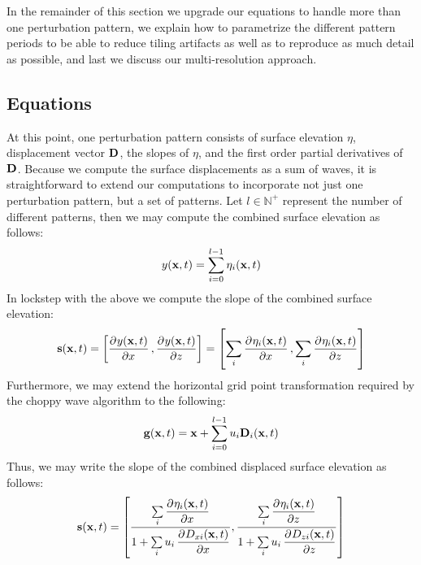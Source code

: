 
In the remainder of this section we upgrade our equations to handle more than
one perturbation pattern, we explain how to parametrize the different pattern
periods to be able to reduce tiling artifacts as well as to reproduce as much
detail as possible, and last we discuss our multi-resolution approach.
%
\subsection{Equations}
At this point, one perturbation pattern consists of surface
elevation $\eta$, displacement vector $\mathbf{D}$, the slopes of $\eta$,
and the first order partial derivatives of $\mathbf{D}$.
Because we compute the surface
displacements as a sum of waves, it is straightforward to extend our
computations to incorporate not just one perturbation pattern, but a set of
patterns. Let $l \in \mathbb{N}^+$ represent the number of different patterns,
then we may compute the combined surface elevation as follows:
\begin{equation}
 y(\mathbf{x},t) = \sum\limits_{i=0}^{l-1}\eta_i(\mathbf{x},t)
\end{equation}
In lockstep with the above we compute the slope of the combined surface elevation:
\begin{equation}
 \mvec{s}(\mvec{x},t) = \left[\dpd{y(\mvec{x},t)}{x},\dpd{y(\mvec{x},t)}{z}\right]
 = \left[\sum\limits_i \dpd{\eta_i(\mvec{x},t)}{x}, \sum\limits_i \dpd{\eta_i(\mvec{x},t)}{z}\right]
\end{equation}
Furthermore, we may extend the horizontal grid point transformation required by
the choppy wave algorithm to the following:
\begin{equation}
\mathbf{g}(\mathbf{x},t) = \mathbf{x}+\sum\limits_{i=0}^{l-1}u_i\mathbf{D}_i(\mathbf{x},t) 
\end{equation}
Thus, we may write the slope of the combined displaced surface elevation as follows:
\begin{equation}
\mvec{s}(\mvec{x},t) = \left[\frac{\sum\limits_i \dpd{\eta_i(\mvec{x},t)}{x}}{1 
+ \sum\limits_i u_i \dpd{D_{xi}(\mvec{x},t)}{x}}, \frac{\sum\limits_i 
\dpd{\eta_i(\mvec{x},t)}{z}}{1 + \sum\limits_i 
u_i\dpd{D_{zi}(\mvec{x},t)}{z}}\right]
\end{equation}
